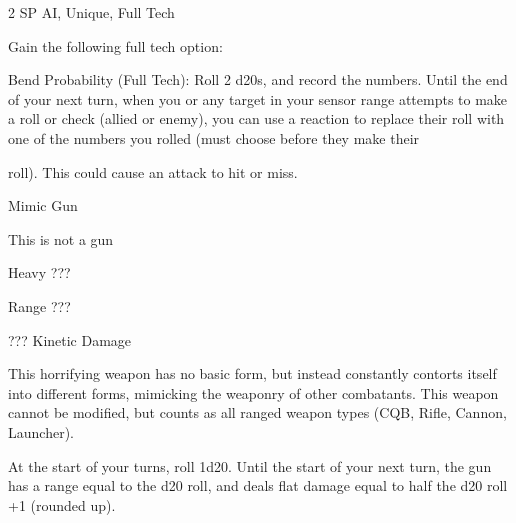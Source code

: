2 SP
AI, Unique, Full Tech

Gain the following full tech option:


	        Bend Probability (Full Tech): Roll 2 d20s, and record the numbers. Until the end of your next turn,
when you or any target in your sensor range attempts to make a roll or check (allied or enemy), you can
use a reaction to replace their roll with one of the numbers you rolled (must choose before they make their

roll). This could cause an attack to hit or miss.


Mimic Gun

This is not a gun

Heavy ???

Range ???

??? Kinetic Damage


This horrifying weapon has no basic form, but instead constantly contorts itself into different
forms, mimicking the weaponry of other combatants. This weapon cannot be modified, but
counts as all ranged weapon types (CQB, Rifle, Cannon, Launcher).


At the start of your turns, roll 1d20. Until the start of your next turn, the gun has a range equal to
the d20 roll, and deals flat damage equal to half the d20 roll +1 (rounded up).
